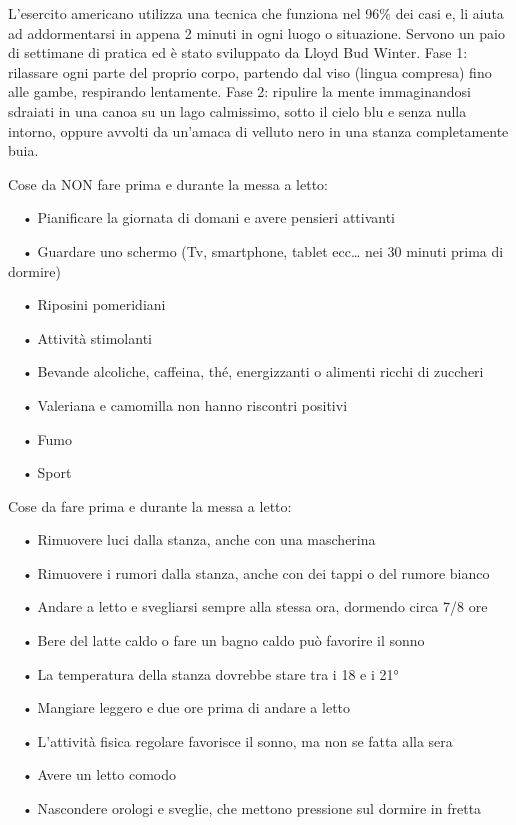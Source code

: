 \documentclass[12pt]{book} %
\begin{document}
\begin{mdframed}[linewidth=1pt]
\bigskip

L'esercito americano utilizza una tecnica che funziona nel 96\% dei casi e, li aiuta ad
addormentarsi in appena 2 minuti in ogni luogo o situazione. Servono un paio di settimane di pratica ed è stato
sviluppato da Lloyd {\textquotedbl}Bud{\textquotedbl} Winter. Fase 1: rilassare ogni parte del proprio corpo, partendo
dal viso (lingua compresa) fino alle gambe, respirando lentamente. Fase 2: ripulire la mente immaginandosi sdraiati in
una canoa su un lago calmissimo, sotto il cielo blu e senza nulla intorno, oppure avvolti da un'amaca di velluto nero
in una stanza completamente buia.


\bigskip

Cose da NON fare prima e durante la messa a letto:

\ \ • Pianificare la giornata di domani e avere pensieri attivanti

\ \ • Guardare uno schermo (Tv, smartphone, tablet ecc… nei 30 minuti prima di dormire)

\ \ • Riposini pomeridiani

\ \ • Attività stimolanti

\ \ • Bevande alcoliche, caffeina, thé, energizzanti o alimenti ricchi di zuccheri

\ \ • Valeriana e camomilla non hanno riscontri positivi 

\ \ • Fumo

\ \ • Sport


\bigskip

Cose da fare prima e durante la messa a letto:

\ \ • Rimuovere luci dalla stanza, anche con una mascherina

\ \ • Rimuovere i rumori dalla stanza, anche con dei tappi o del rumore bianco

\ \ • Andare a letto e svegliarsi sempre alla stessa ora, dormendo circa 7/8 ore

\ \ • Bere del latte caldo o fare un bagno caldo può favorire il sonno

\ \ • La temperatura della stanza dovrebbe stare tra i 18 e i 21°

\ \ • Mangiare leggero e due ore prima di andare a letto

\ \ • L'attività fisica regolare favorisce il sonno, ma non se fatta alla sera

\ \ • Avere un letto comodo 

\ \ • Nascondere orologi e sveglie, che mettono pressione sul dormire in fretta
\end{mdframed}
\end{document}
